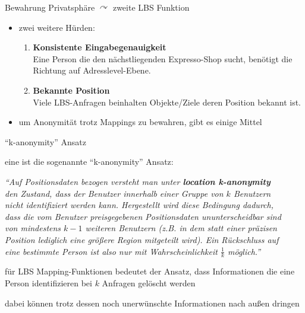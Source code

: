\begin{frame}{Bewahrung Privatsphäre $\curvearrowright$ zweite LBS Funktion}
\begin{itemize}
  \item zwei weitere Hürden:
    \begin{enumerate}
      \item \textbf{Konsistente Eingabegenauigkeit} \\
      Eine Person die den nächstliegenden Expresso-Shop sucht, benötigt die Richtung auf Adresslevel-Ebene.
      \item \textbf{Bekannte Position} \\
      Viele LBS-Anfragen beinhalten Objekte/Ziele deren Position bekannt ist.
    \end{enumerate}
  \item um Anonymität trotz Mappings zu bewahren, gibt es einige Mittel
\end{itemize}
\end{frame}

\begin{frame}{"`k-anonymity"' Ansatz}
\itemize
\item eine ist die sogenannte "`k-anonymity"' Ansatz: \\ \vspace{.1cm}
  \begin{small}
	\hspace{-1.2cm} \textit{"`Auf Positionsdaten bezogen versteht man unter \textbf{location k-anonymity}\\
	\hspace{-1.2cm} den Zustand, dass der Benutzer innerhalb einer Gruppe von $k$ Benutzern\\
	\hspace{-1.2cm} nicht identifiziert werden kann. Hergestellt wird diese Bedingung dadurch,\\
	\hspace{-1.2cm} dass die vom Benutzer preisgegebenen Positionsdaten ununterscheidbar sind\\
	\hspace{-1.2cm} von mindestens $k - 1$ weiteren  Benutzern (z.B. in dem statt einer präzisen\\
	\hspace{-1.2cm} Position lediglich eine größere Region mitgeteilt wird). Ein Rückschluss auf\\
	\hspace{-1.2cm} eine bestimmte Person ist also nur mit Wahrscheinlichkeit $\frac{1}{k}$ möglich."'}
  \end{small}
\item für LBS Mapping-Funktionen bedeutet der Ansatz, dass Informationen die eine Person identifizieren bei $k$ Anfragen gelöscht werden
\item dabei können trotz dessen noch unerwünschte Informationen nach außen dringen
\enditemize
\end{frame}

